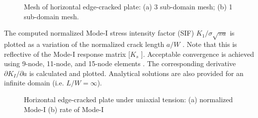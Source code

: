 \documentclass[12pt]{article}
\begin{document}
\begin{figure}[H]
    \centering
    \captionsetup{labelformat=empty}
    \caption{Mesh of horizontal edge-cracked plate: (a) 3 sub-domain mesh; (b) 1 sub-domain mesh.}  
\end{figure}
The computed normalized Mode-I stress intensity factor (SIF) $K_1/\sigma\sqrt{\pi a}$ is plotted as a variation of the normalized crack
length $a/W$ . Note that this is reflective of the Mode-I response matrix [$K_s$ ]. Acceptable convergence is achieved using
9-node, 11-node, and 15-node elements . The corresponding derivative $\partial K_I/\partial a$ is calculated and plotted. 
Analytical solutions are also provided for an infinite domain (i.e. $L/
W = \infty$).
\begin{figure}[H]
    \centering
    \captionsetup{labelformat=empty}
    \caption{Horizontal edge-cracked plate under uniaxial tension: (a) normalized Mode-I (b) rate of Mode-I}  
\end{figure}
\end{document}
